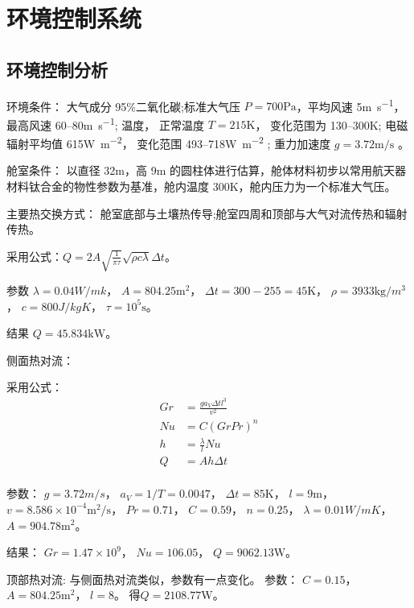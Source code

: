 \chapter{环境控制系统}
\label{chp:envctrl:begin}

\section{环境控制分析}
环境条件：
大气成分 95\%二氧化碳;标准大气压 $P=700\si{\Pa}$，平均风速 5\si{\metre\per\second}， 最高风速 60--80\si{\metre\per\second}; 温度，
正常温度 $T=215\si{\kelvin}$， 变化范围为 130--300\si{\kelvin}; 电磁辐射平均值 615\si{\watt\per\metre\squared}， 变化范围 493--718\si{\watt\per\metre\squared} ; 重力加速度 $g=3.72\si{\metre\per\second}$ 。

舱室条件：
以直径 32\si{\metre}，高 9\si{\metre} 的圆柱体进行估算，舱体材料初步以常用航天器材料钛合金的物性参数为基准，舱内温度 300\si{\kelvin}，舱内压力为一个标准大气压。

主要热交换方式：
舱室底部与土壤热传导;舱室四周和顶部与大气对流传热和辐射传热。

采用公式：$Q=2A\sqrt{\frac{1}{\pi\tau}}\sqrt{\rho c\lambda}\Delta t$。

参数
$ \lambda = 0.04\si{W/{mk}}$，
$ A = 804.25\si{\metre\squared} $，
$ \Delta t = 300 - 255 = 45\si{\kelvin}  $，
$ \rho = 3933\si{\kilogram\per m^3} $，
$ c = 800\si{J/{kgK}}$，
$ \tau = 10^5\si{\second} $。

结果 $Q = 45.834 \si{\kilo\watt}$。

侧面热对流：

采用公式：
\begin{align*}
  {Gr} &= \frac{ga_V\Delta tl^3}{v^2} \\
  { Nu } &= C({Gr} {Pr})^n \\
  h &= \frac{\lambda}{l}{Nu} \\
  Q &= Ah\Delta t \\
\end{align*}

参数：
$g=3.72\si{m/s} $，
$a_V=1/T=0.0047 $，
$\Delta t=85\si{\kelvin} $，
$l=9\si{\metre} $，
$v=8.586\times 10^{-4}\si{\metre\squared\per\second} $，
$Pr=0.71 $，
$C=0.59 $，
$n=0.25 $，
$\lambda=0.01\si{W/{mK}}$，
$A=904.78\si{\metre\squared}$。

结果：
$Gr=1.47 \times 10^9 $，
$Nu=106.05 $，
$Q=9062.13\si{\watt}$。

顶部热对流:
与侧面热对流类似，参数有一点变化。
参数：
$C=0.15$，
$A=804.25\si{\meter\squared}$，
$l=8$。
得$Q=2108.77\si{\watt}$。

